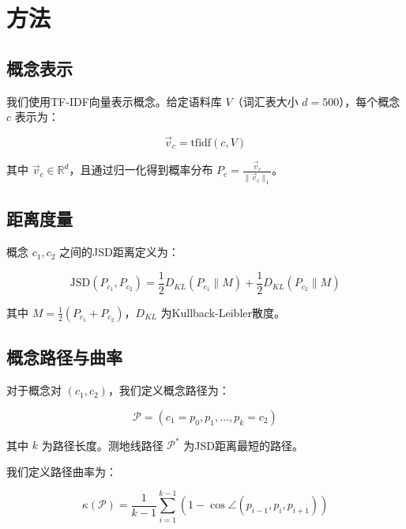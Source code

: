 \documentclass[
 UTF8,
 fontset=mac,
]{ctexart}
\begin{document}
\section{方法}\label{methodology}

\subsection{概念表示}\label{concept-representation}

我们使用TF-IDF向量表示概念。给定语料库 $V$（词汇表大小 $d=500$），每个概念 $c$ 表示为：

\begin{equation}
\vec{v}_c = \text{tfidf}(c, V)
\end{equation}

其中 $\vec{v}_c \in \mathbb{R}^d$，且通过归一化得到概率分布 $P_c = \frac{\vec{v}_c}{\|\vec{v}_c\|_1}$。

\subsection{距离度量}\label{distance-metrics}

概念 $c_1, c_2$ 之间的JSD距离定义为：

\begin{equation}
\text{JSD}(P_{c_1}, P_{c_2}) = \frac{1}{2} D_{KL}\left(P_{c_1} \parallel M\right) + \frac{1}{2} D_{KL}\left(P_{c_2} \parallel M\right)
\end{equation}

其中 $M = \frac{1}{2}(P_{c_1} + P_{c_2})$，$D_{KL}$ 为Kullback-Leibler散度。

\subsection{概念路径与曲率}\label{concept-paths-curvature}

对于概念对 $(c_1, c_2)$，我们定义概念路径为：

\begin{equation}
\mathcal{P} = (c_1 = p_0, p_1, \ldots, p_k = c_2)
\end{equation}

其中 $k$ 为路径长度。测地线路径 $\mathcal{P}^*$ 为JSD距离最短的路径。

我们定义路径曲率为：

\begin{equation}
\kappa(\mathcal{P}) = \frac{1}{k-1} \sum_{i=1}^{k-1} \left(1 - \cos \angle(p_{i-1}, p_i, p_{i+1})\right)
\end{equation}
\end{document}
